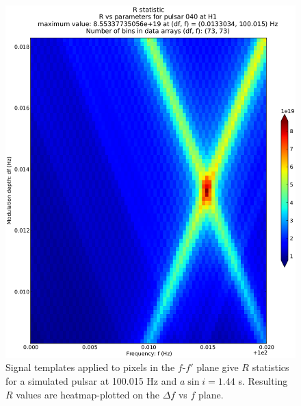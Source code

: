 \documentclass[12pt]{iopart}
\begin{document}
\begin{figure}
\begin{center}
\includegraphics[trim=20 20 20 80, clip, keepaspectratio,height=0.55\paperheight]{plots/R-4e21-on-4e24.eps}
\caption{Signal templates applied to pixels in the $f$-$f'$ plane give $R$ statistics for a simulated pulsar 
at 100.015 Hz and $a \sin i = 1.44$ s. Resulting $R$ values are heatmap-plotted on the $\Delta f$ vs $f$ plane.}
\label{inj_R_statistic}
\end{center}
\end{figure}
\end{document}
